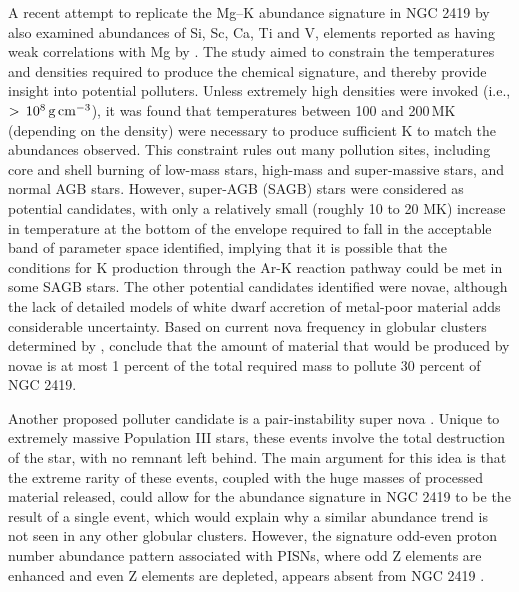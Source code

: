 \documentclass[a4paper,fleqn,usenatbib]{mnras}
\begin{document}

A recent attempt to replicate the Mg--K abundance signature in NGC 2419 by \cite{iliadis2016} also examined abundances of Si, Sc, Ca, Ti and V, elements reported as having weak correlations with Mg by \cite{cohenkirby2012}. The study aimed to constrain the temperatures and densities required to produce the chemical signature, and thereby provide insight into potential polluters.
Unless extremely high densities were invoked (i.e., $>\,10^8\,{\rm g\,cm}^{-3}$), it was found that temperatures between 100 and 200\,MK (depending on the density) were necessary to produce sufficient K to match the abundances observed. This constraint rules out many pollution sites, including core and shell burning of low-mass stars, high-mass and super-massive stars, and normal AGB stars. However, super-AGB (SAGB) stars were considered as potential candidates, with only a relatively small (roughly 10 to 20 MK) increase in temperature at the bottom of the envelope required to fall in the acceptable band of parameter space identified, implying that it is possible that the conditions for K production through the Ar-K reaction pathway could be met in some SAGB stars. The other potential candidates identified were novae, although the lack of detailed models of white dwarf accretion of metal-poor material adds considerable uncertainty. Based on current nova frequency in globular clusters determined by \cite{kato2013novae}, \cite{iliadis2016} conclude that the amount of material that would be produced by novae is at most 1 percent of the total required mass to pollute 30 percent of NGC 2419.

Another proposed  polluter candidate is a pair-instability super nova \citep[PISN;][]{carretta2013}. Unique to extremely massive Population III stars, these events involve the total destruction of the star, with no remnant left behind. The main argument for this idea is that the extreme rarity of these events, coupled with the huge masses of processed material released, could allow for the abundance signature in NGC 2419 to be the result of a single event, which would explain why a similar abundance trend is not seen in any other globular clusters. However, the signature odd-even proton number abundance pattern associated with PISNs, where odd Z elements are enhanced and even Z elements are depleted, appears absent from NGC 2419 \citep{carretta2013, cohenkirby2012}.
\end{document}
